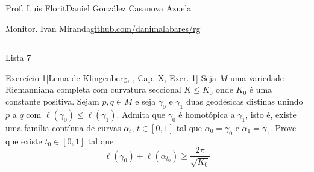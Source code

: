 \clearpage
\begin{minipage}{\textwidth}
	\begin{minipage}{1\textwidth}
		{\small Prof. Luis Florit\hfill Daniel González Casanova Azuela}
		
		{\small Monitor. Ivan Miranda\hfill\href{https://github.com/danimalabares/rg}{github.com/danimalabares/rg}}
	\end{minipage}
\end{minipage}\vspace{.2cm}\hrule

\vspace{10pt}
{\huge Lista 7}
\begin{thing6}{Exercício 1}[Lema de Klingenberg, \cite{doc}, Cap. X, Exer. 1]\label{exer:1}\leavevmode
	Seja \(M\) uma variedade Riemanniana completa com curvatura seccional \(K \leq  K_0\) onde \(K_0\) é uma constante positiva. Sejam \(p,q \in M\) e seja \(\gamma_0\) e \(\gamma_1\) duas geodésicas distinas unindo \(p\) a \(q\) com  \(\ell(\gamma_0) \leq  \ell(\gamma_1)\). Admita que \(\gamma_0\) é homotópica a \(\gamma_1\), isto é, existe uma família contínua de curvas \(\alpha_t\), \(t \in [0,1]\) tal que \(\alpha_0 = \gamma_0\) e \(\alpha_1=\gamma_1\). Prove que existe \(t_0 \in [0,1]\) tal que
	\[\ell(\gamma_0)+\ell(\alpha_{t_0}) \geq  \frac{2\pi}{\sqrt{K_0} }\]
\end{thing6}

